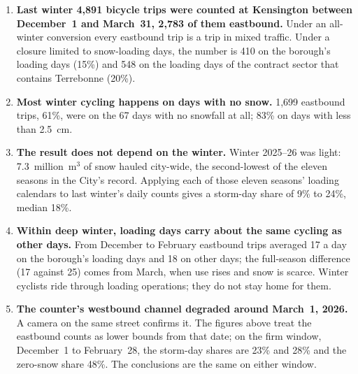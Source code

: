 \documentclass[11pt,letterpaper]{article}
\begin{document}
\begin{enumerate}[nosep]
  \item \begin{minipage}[t]{\linewidth}\textbf{Last winter 4{,}891 bicycle trips were counted at Kensington
    between December~1 and March~31, 2{,}783 of them eastbound.} Under an
    all-winter conversion every eastbound trip is a trip in mixed traffic.
    Under a closure limited to snow-loading days, the number is 410 on the
    borough's loading days (15\%) and 548 on the loading days of the
    contract sector that contains Terrebonne (20\%).\end{minipage}\vspace{0.35em}
  \item \begin{minipage}[t]{\linewidth}\textbf{Most winter cycling happens on days with no snow.} 1{,}699
    eastbound trips, 61\%, were on the 67 days with no snowfall at all;
    83\% on days with less than 2.5~cm.\end{minipage}\vspace{0.35em}
  \item \begin{minipage}[t]{\linewidth}\textbf{The result does not depend on the winter.} Winter 2025--26 was
    light: 7.3~million~m$^3$ of snow hauled city-wide, the second-lowest
    of the eleven seasons in the City's record. Applying each of those
    eleven seasons' loading calendars to last winter's daily counts gives
    a storm-day share of 9\% to 24\%, median 18\%.\end{minipage}\vspace{0.35em}
  \item \begin{minipage}[t]{\linewidth}\textbf{Within deep winter, loading days carry about the same
    cycling as other days.} From December to February eastbound trips
    averaged 17 a day on the borough's loading days and 18 on other days;
    the full-season difference (17 against 25) comes from March, when use
    rises and snow is scarce. Winter cyclists ride through loading
    operations; they do not stay home for them.\end{minipage}\vspace{0.35em}
  \item \begin{minipage}[t]{\linewidth}\textbf{The counter's westbound channel degraded around March~1,
    2026.} A camera on the same street confirms it. The figures above
    treat the eastbound counts as lower bounds from that date; on the firm
    window, December~1 to February~28, the storm-day shares are 23\% and
    28\% and the zero-snow share 48\%. The conclusions are the same on
    either window.\end{minipage}
\end{enumerate}
\end{document}

